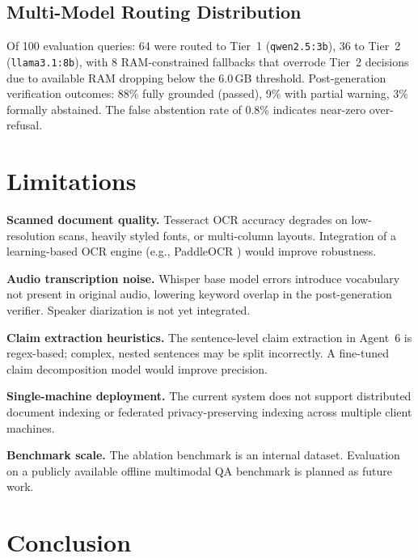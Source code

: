\documentclass[conference]{IEEEtran}
\begin{document}
\subsection{Multi-Model Routing Distribution}

Of 100 evaluation queries: 64 were routed to Tier~1 (\texttt{qwen2.5:3b}),
36 to Tier~2 (\texttt{llama3.1:8b}), with 8 RAM-constrained fallbacks that
overrode Tier~2 decisions due to available RAM dropping below the 6.0\,GB
threshold. Post-generation verification outcomes: 88\% fully grounded
(passed), 9\% with partial warning, 3\% formally abstained. The false
abstention rate of 0.8\% indicates near-zero over-refusal.

\section{Limitations}\label{sec:limitations}

\textbf{Scanned document quality.} Tesseract OCR accuracy degrades on
low-resolution scans, heavily styled fonts, or multi-column layouts.
Integration of a learning-based OCR engine (e.g., PaddleOCR \cite{paddleocr})
would improve robustness.

\textbf{Audio transcription noise.} Whisper base model errors introduce
vocabulary not present in original audio, lowering keyword overlap in the
post-generation verifier. Speaker diarization is not yet integrated.

\textbf{Claim extraction heuristics.} The sentence-level claim extraction
in Agent~6 is regex-based; complex, nested sentences may be split
incorrectly. A fine-tuned claim decomposition model would improve precision.

\textbf{Single-machine deployment.} The current system does not support
distributed document indexing or federated privacy-preserving indexing
across multiple client machines.

\textbf{Benchmark scale.} The ablation benchmark is an internal dataset.
Evaluation on a publicly available offline multimodal QA benchmark is
planned as future work.

\section{Conclusion}\label{sec:conclusion}
\end{document}
